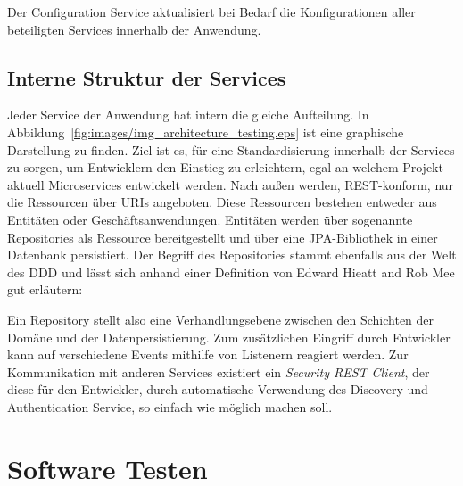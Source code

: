 \documentclass[12pt,a4paper,bibliography=totocnumbered,listof=totocnumbered]{scrartcl}
\begin{document}
Der Configuration Service aktualisiert bei Bedarf die Konfigurationen aller beteiligten Services innerhalb der Anwendung.


\subsection{Interne Struktur der Services}

Jeder Service der Anwendung hat intern die gleiche Aufteilung. In Abbildung~\ref{fig:images/img_architecture_testing.eps} ist eine graphische Darstellung zu finden. Ziel ist es, für eine Standardisierung innerhalb der Services zu sorgen, um Entwicklern den Einstieg zu erleichtern, egal an welchem Projekt aktuell Microservices entwickelt werden. Nach außen werden, REST-konform, nur die Ressourcen über \acp{URI} angeboten. Diese Ressourcen bestehen entweder aus Entitäten oder Geschäftsanwendungen. Entitäten werden über sogenannte Repositories als Ressource bereitgestellt und über eine \acs{JPA}-Bibliothek in einer Datenbank persistiert. Der Begriff des Repositories stammt ebenfalls aus der Welt des \ac{DDD} und lässt sich anhand einer Definition von Edward Hieatt and Rob Mee gut erläutern\cite{hieatt}:


Ein Repository stellt also eine Verhandlungsebene zwischen den Schichten der Domäne und der Datenpersistierung.
Zum zusätzlichen Eingriff durch Entwickler kann auf verschiedene Events mithilfe von Listenern reagiert werden. Zur Kommunikation mit anderen Services existiert ein \textit{Security REST Client}, der diese für den Entwickler, durch automatische Verwendung des Discovery und Authentication Service, so einfach wie möglich machen soll. 



\section{Software Testen}
\end{document}
